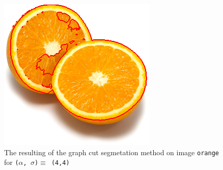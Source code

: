 {\begin{minipage}{0.45\linewidth}
    \vfill
    \begin{figure}[H]
      \includegraphics[scale=0.5]{./images/04/Q11/var_a_b/orange/graphcut2_a4_s4.png}
      \caption{The resulting of the graph cut segmetation method on image \texttt{orange} for
        \texttt{($\alpha$, $\sigma$)$ \equiv$ (4,4)}}
      \label{fig:04_orange2_a4_s4}
    \end{figure}
  \end{minipage}
}


